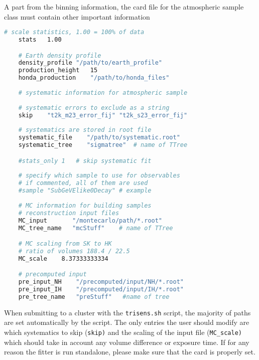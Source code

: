 \documentclass[a4paper, 11pt]{article}
\begin{document}
A part from the binning information, the card file for the atmospheric sample class must contain other important information
\begin{lstlisting}[language=bash]
    # scale statistics, 1.00 = 100% of data
    stats	1.00

    # Earth density profile
    density_profile	"/path/to/earth_profile"
    production_height	15
    honda_production	"/path/to/honda_files"
    
    # systematic information for atmospheric sample
    
    # systematic errors to exclude as a string
    skip	"t2k_m23_error_fij" "t2k_s23_error_fij"
    
    # systematics are stored in root file
    systematic_file    "/path/to/systematic.root"
    systematic_tree    "sigmatree"	# name of TTree

    #stats_only	1	# skip systematic fit
    
    # specify which sample to use for observables
    # if commented, all of them are used
    #sample	"SubGeVElike0Decay"	# example
    
    # MC information for building samples
    # reconstruction input files
    MC_input	   "/montecarlo/path/*.root"
    MC_tree_name   "mcStuff"	# name of TTree

    # MC scaling from SK to HK
    # ratio of volumes 188.4 / 22.5
    MC_scale	8.37333333334

    # precomputed input
    pre_input_NH	"/precomputed/input/NH/*.root"
    pre_input_IH	"/precomputed/input/IH/*.root"
    pre_tree_name	"preStuff"   #name of tree
\end{lstlisting}
When submitting to a cluster with the \texttt{trisens.sh} script, %
the majority of paths are set automatically by the script.
The only entries the user should modify are which systematics to skip (\texttt{skip)} %
and the scaling of the input file (\texttt{MC\_scale)} which should take in account any %
volume difference or exposure time.
If for any reason the fitter is run standalone, please make sure that the card is properly set.
\end{document}

